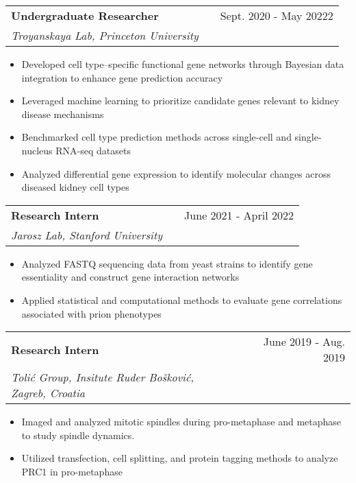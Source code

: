 \documentclass[a4paper,12pt]{article}
\makeatletter
\newenvironment{joblong}[3]
    {
    \begin{tabularx}{\linewidth}{@{}l X r@{}}
    \textbf{#1} & \hfill &  #2 \\
    \textit{#3} & & \\[3.75pt]  
    \end{tabularx}
    \begin{minipage}[t]{\linewidth}
    \begin{itemize}[nosep,after=\strut, leftmargin=1em, itemsep=3pt,label=\scriptsize$\bullet$]
    }
    {
    \end{itemize}
    \end{minipage}    
    }
\makeatother
\begin{document}
\begin{joblong}{Undergraduate Researcher}{Sept. 2020 - May 20222}{Troyanskaya Lab, Princeton University}
\item Developed cell type–specific functional gene networks through Bayesian data integration to enhance gene prediction accuracy
\item Leveraged machine learning to prioritize candidate genes relevant to kidney disease mechanisms
\item Benchmarked cell type prediction methods across single-cell and single-nucleus RNA-seq datasets 
\item Analyzed differential gene expression to identify molecular changes across diseased kidney cell types
\end{joblong}



\begin{joblong}{Research Intern}{June 2021 - April 2022}{Jarosz Lab, Stanford University}
\item Analyzed FASTQ sequencing data from yeast strains to identify gene essentiality and construct gene interaction networks
\item Applied statistical and computational methods to evaluate gene correlations associated with prion phenotypes
\end{joblong}

\begin{joblong}{Research Intern}{June 2019 - Aug. 2019}{Tolić Group, Insitute Ruder Bošković, Zagreb, Croatia}
\item Imaged and analyzed mitotic spindles during pro-metaphase and metaphase to study spindle dynamics.
\item Utilized transfection, cell splitting, and protein tagging methods to analyze PRC1 in pro-metaphase
\end{joblong}
\end{document}
